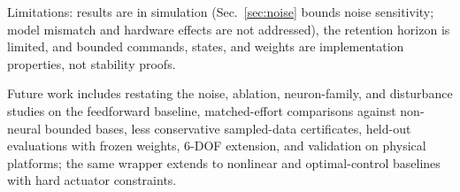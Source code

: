 \documentclass[letterpaper, 10 pt, conference]{ieeeconf}
\begin{document}
Limitations: results are in simulation (Sec.~\ref{sec:noise} bounds noise sensitivity; model mismatch and hardware effects are not addressed), the retention horizon is limited, and bounded commands, states, and weights are implementation properties, not stability proofs.

Future work includes restating the noise, ablation, neuron-family, and disturbance studies on the feedforward baseline, matched-effort comparisons against non-neural bounded bases, less conservative sampled-data certificates, held-out evaluations with frozen weights, 6-DOF extension, and validation on physical platforms; the same wrapper extends to nonlinear and optimal-control baselines with hard actuator constraints.





\end{document}
